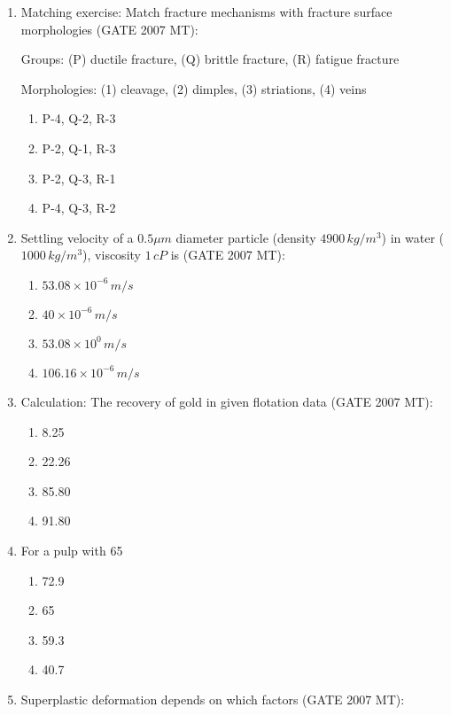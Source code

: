 \documentclass[12pt]{article}
\begin{document}
\begin{enumerate}
\item Matching exercise: Match fracture mechanisms with fracture surface morphologies (GATE 2007 MT):

Groups: (P) ductile fracture, (Q) brittle fracture, (R) fatigue fracture

Morphologies: (1) cleavage, (2) dimples, (3) striations, (4) veins

\begin{enumerate}
  \item P-4, Q-2, R-3
  \item P-2, Q-1, R-3
  \item P-2, Q-3, R-1
  \item P-4, Q-3, R-2
\end{enumerate}

\item Settling velocity of a \(0.5 \mu m\) diameter particle (density \(4900\,kg/m^3\)) in water (\(1000\,kg/m^3\)), viscosity \(1\,cP\) is (GATE 2007 MT):
\begin{enumerate}
  \item \(53.08 \times 10^{-6}\, m/s\)
  \item \(40 \times 10^{-6}\, m/s\)
  \item \(53.08 \times 10^0\, m/s\)
  \item \(106.16 \times 10^{-6}\, m/s\)
\end{enumerate}

\item Calculation: The recovery of gold in given flotation data (GATE 2007 MT):
\begin{enumerate}
  \item 8.25%
  \item 22.26%
  \item 85.80%
  \item 91.80%
\end{enumerate}

\item For a pulp with 65%
\begin{enumerate}
  \item 72.9%
  \item 65%
  \item 59.3%
  \item 40.7%
\end{enumerate}

\item Superplastic deformation depends on which factors (GATE 2007 MT):


\end{enumerate}
\end{document}
